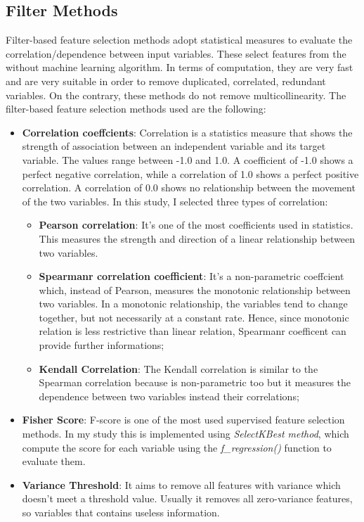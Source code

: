 \subsection{Filter Methods}
Filter-based feature selection methods adopt statistical measures to evaluate the correlation/dependence between input variables.
These select features from the without machine learning algorithm. In terms of computation, they are very fast and are very suitable in order to remove duplicated, correlated, redundant variables. On the contrary,  these methods do not remove multicollinearity.
The filter-based feature selection methods used are the following:
\begin{itemize}
\item \textbf{Correlation coeffcients}: Correlation is a statistics measure that shows the strength of association between an independent variable and its target variable. The values range between -1.0 and 1.0. A coefficient of -1.0 shows a perfect negative correlation, while a correlation of 1.0 shows a perfect positive correlation. A correlation of 0.0 shows no relationship between the movement of the two variables. In this study, I selected three types of correlation:
\begin{itemize}
\item \textbf{Pearson correlation}: It's one of the most coefficients used in statistics. This measures the strength and direction of a linear relationship between two variables. 
\item \textbf{Spearmanr correlation coefficient}: It's a non-parametric coeffcient which, instead of Pearson, measures the monotonic relationship between two variables. In a monotonic relationship, the variables tend to change together, but not necessarily at a constant rate. Hence, since monotonic relation is less restrictive than linear relation, Spearmanr coefficent can provide further informations;
\item \textbf{Kendall Correlation}: The Kendall correlation is similar to the Spearman correlation because is non-parametric too but it measures the dependence between two variables instead their correlations;
\end{itemize}
\item \textbf{Fisher Score}: F-score is one of the most used supervised feature selection methods. In my study this is implemented using \textit{SelectKBest method}, which compute the score for each variable using the \textit{f\_regression()} function to evaluate them.
\item \textbf{Variance Threshold}: It aims to remove all features with variance which doesn’t meet a threshold value. Usually it removes all zero-variance features, so variables that contains useless information.
\end{itemize}


